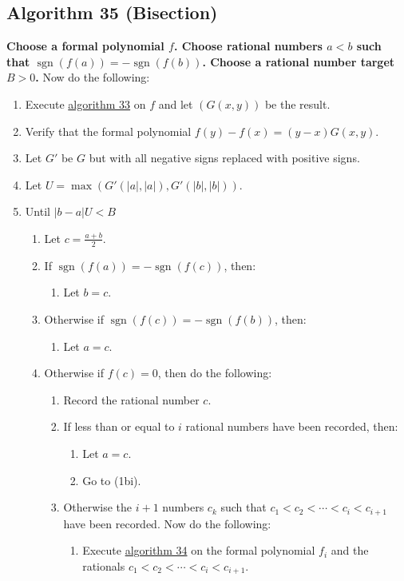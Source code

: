 \documentclass[twocolumn]{article}
\DeclareMathOperator{\sgn}{sgn}
\begin{document}
		\subsection{Algorithm 35 (Bisection)}\label{sec:algorithm 35}
			\textbf{Choose a formal polynomial $f$. Choose rational numbers $a<b$ such that $\sgn(f(a))=-\sgn(f(b))$. Choose a rational number target $B>0$.} Now do the following:
			\begin{enumerate}
				\item Execute \hyperref[sec:algorithm 33]{algorithm 33} on $f$ and let $(G(x,y))$ be the result.
				\item Verify that the formal polynomial $f(y)-f(x)=(y-x)G(x,y)$.
				\item Let $G'$ be $G$ but with all negative signs replaced with positive signs.
				\item Let $U=\max(G'(\lvert a\rvert,\lvert a\rvert), G'(\lvert b\rvert,\lvert b\rvert))$.
				\item Until $\lvert b-a\rvert U<B$
				\begin{enumerate}
					\item Let $c=\frac{a+b}{2}$.
					\item If $\sgn(f(a))=-\sgn(f(c))$, then:
					\begin{enumerate}
						\item Let $b=c$.
					\end{enumerate}
					\item Otherwise if $\sgn(f(c))=-\sgn(f(b))$, then:
					\begin{enumerate}
						\item Let $a=c$.
					\end{enumerate}
					\item Otherwise if $f(c)=0$, then do the following:
					\begin{enumerate}
						\item Record the rational number $c$.
						\item If less than or equal to $i$ rational numbers have been recorded, then:
						\begin{enumerate}
							\item Let $a=c$.
							\item Go to (1bi).
						\end{enumerate}
						\item Otherwise the $i+1$ numbers $c_k$ such that $c_1<c_2<\cdots<c_i<c_{i+1}$ have been recorded. Now do the following:
						\begin{enumerate}
							\item Execute \hyperref[sec:algorithm 34]{algorithm 34} on the formal polynomial $f_i$ and the rationals $c_1<c_2<\cdots<c_i<c_{i+1}$.

\end{enumerate}
\end{enumerate}
\end{enumerate}
\end{enumerate}
\end{document}
